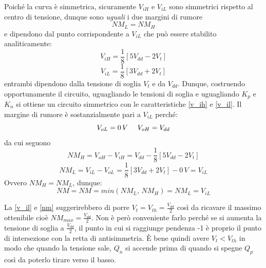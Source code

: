 \documentclass[12pt, a4paper]{report}
\begin{document}
Poiché la curva è simmetrica, sicuramente $V_{iH}$ e $V_{iL}$ sono simmetrici rispetto al centro di tensione, dunque sono \textit{uguali} i due margini di rumore
\begin{equation}
    \textit{NM}_{L} = \textit{NM}_{H}
\end{equation}
e dipendono dal punto corrispondente a $V_{iL}$ che può essere stabilito analiticamente:
\begin{equation}
    V_{iH} = \frac{1}{8}[5V_{dd} - 2V_{t}]
    \label{v_ih}
\end{equation}
\begin{equation}
    V_{iL} = \frac{1}{8}[3V_{dd} + 2V_{t}]
    \label{v_il}
\end{equation}
entrambi dipendono dalla tensione di soglia $V_t$ e da $V_{dd}$. Dunque, costruendo opportunamente il circuito, uguagliando le tensioni di soglia e uguagliando $K_{p}$ e $K_{n}$ si ottiene un circuito simmetrico con le caratteristiche \eqref{v_ih} e \eqref{v_il}. Il margine di rumore è sostanzialmente pari a $V_{iL}$ perché:
\begin{equation}
    V_{oL} = 0\,V \text{ \, \, } V_{oH} = V_{dd}
\end{equation}
da cui seguono
\begin{equation}
    \textit{NM}_{H} = V_{oH} - V_{iH} = V_{dd} - \frac{1}{8}[5V_{dd} - 2V_{t}]
\end{equation}
\begin{equation}
    \textit{NM}_{L} = V_{iL} - V_{oL} = \frac{1}{8}[3V_{dd} + 2V_{t}] - 0\,V = V_{iL}
\end{equation}
Ovvero $\textit{NM}_{H} = \textit{NM}_{L}$, dunque:
\begin{equation}
    \textit{NM} = \textit{NM} = min(\textit{NM}_{L},\, \textit{NM}_{H}) = \textit{NM}_{L} = V_{iL}
    \label{nm}
\end{equation}

La \eqref{v_il} e \eqref{nm} suggerirebbero di porre $V_{t} = V_{th} = \frac{V_{dd}}{2}$ così da ricavare il massimo ottenibile cioè $\textit{NM}_{max} = \frac{V_{dd}}{2}$. Non è però conveniente farlo perché se si aumenta la tensione di soglia a $\frac{V_{dd}}{2}$, il punto in cui si raggiunge pendenza -1 è proprio il punto di intersezione con la retta di antisimmetria. È bene quindi avere $V_{t} < V_{th}$ in modo che quando la tensione sale, $Q_n$ si accende prima di quando si spegne $Q_p$ così da poterlo tirare verso il basso.
\end{document}
